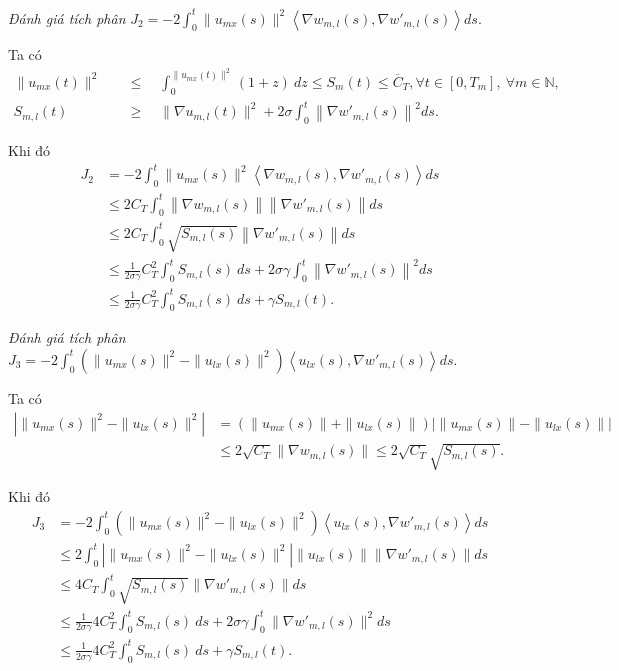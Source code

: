 \documentclass[12pt,a4paper]{article}
\def\N{\mathbb{N}}
\theoremstyle{definition}
\theoremstyle{definition}
\begin{document}
\textit{Đánh giá tích phân} $\displaystyle J_2 = - 2 \int_0^t \|u_{mx}(s)\|^2 \left<\nabla w_{m,l}(s), \nabla w'_{m,l}(s)\right> ds$.

Ta có
\begin{align*}
    \|u_{mx}(t)\|^2 \quad &\le \quad \int_0^{\|u_{mx}(t)\|^2} (1+z)\:dz \le S_m(t) \le \overline{C}_T, \forall t \in [0,T_m],\ \forall m \in \N, \\
    S_{m,l}(t) \quad &\ge \quad \|\nabla u_{m,l}(t)\|^2 + 2\sigma \int_0^t \left\|\nabla w'_{m,l}(s)\right\|^2 ds.
\end{align*}

Khi đó
\begin{align*}
    J_2 &= - 2 \int_0^t \|u_{mx}(s)\|^2 \left<\nabla w_{m,l}(s), \nabla w'_{m,l}(s)\right> ds \\
    &\le 2C_T \int_0^t \left\|\nabla w_{m,l}(s)\right\| \left\|\nabla w'_{m,l}(s)\right\| ds \\
    &\le 2C_T \int_0^t \sqrt{S_{m,l}(s)} \left\|\nabla w'_{m,l}(s)\right\| ds \\
    &\le \frac{1}{2\sigma\gamma}C_T^2 \int_0^t S_{m,l}(s)\:ds + 2\sigma\gamma \int_0^t \left\|\nabla w'_{m,l}(s)\right\|^2 ds \\
    &\le \frac{1}{2\sigma\gamma}C_T^2 \int_0^t S_{m,l}(s)\:ds + \gamma S_{m,l}(t).
\end{align*}

\textit{Đánh giá tích phân} $\displaystyle J_3 = - 2 \int_0^t \left(\|u_{mx}(s)\|^2 - \|u_{lx}(s)\|^2\right) \left< u_{lx}(s), \nabla w'_{m,l}(s)\right> ds$.

Ta có
\begin{align*}
    \left|\|u_{mx}(s)\|^2 - \|u_{lx}(s)\|^2\right|
    &= \left(\|u_{mx}(s)\| + \|u_{lx}(s)\|\right)\big|\|u_{mx}(s)\| - \|u_{lx}(s)\|\big| \\
    &\le 2\sqrt{C_T} \|\nabla w_{m,l}(s)\| \le 2\sqrt{C_T} \sqrt{S_{m,l}(s)}.
\end{align*}

Khi đó
\begin{align*}
    J_3 &= - 2 \int_0^t \left(\|u_{mx}(s)\|^2 - \|u_{lx}(s)\|^2\right) \left< u_{lx}(s), \nabla w'_{m,l}(s)\right> ds \\
    &\le 2 \int_0^t \left|\|u_{mx}(s)\|^2 - \|u_{lx}(s)\|^2\right| \|u_{lx}(s)\| \|\nabla w'_{m,l}(s)\| ds \\
    &\le 4C_T \int_0^t \sqrt{S_{m,l}(s)} \|\nabla w'_{m,l}(s)\| ds \\
    &\le \frac{1}{2\sigma\gamma}4C_T^2 \int_0^t S_{m,l}(s)\:ds + 2\sigma\gamma \int_0^t \|\nabla w'_{m,l}(s)\|^2 ds \\
    &\le \frac{1}{2\sigma\gamma}4C_T^2 \int_0^t S_{m,l}(s)\:ds + \gamma S_{m,l}(t).
\end{align*}
\end{document}
